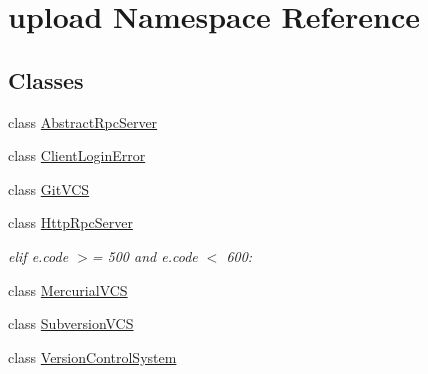 \hypertarget{namespaceupload}{}\section{upload Namespace Reference}
\label{namespaceupload}
\subsection*{Classes}
\begin{DoxyCompactItemize}
\item 
class \mbox{\hyperlink{classupload_1_1_abstract_rpc_server}{Abstract\+Rpc\+Server}}
\item 
class \mbox{\hyperlink{classupload_1_1_client_login_error}{Client\+Login\+Error}}
\item 
class \mbox{\hyperlink{classupload_1_1_git_v_c_s}{Git\+V\+CS}}
\item 
class \mbox{\hyperlink{classupload_1_1_http_rpc_server}{Http\+Rpc\+Server}}
\begin{DoxyCompactList}\small\item\em elif e.\+code $>$= 500 and e.\+code $<$ 600\+: \end{DoxyCompactList}\item 
class \mbox{\hyperlink{classupload_1_1_mercurial_v_c_s}{Mercurial\+V\+CS}}
\item 
class \mbox{\hyperlink{classupload_1_1_subversion_v_c_s}{Subversion\+V\+CS}}
\item 
class \mbox{\hyperlink{classupload_1_1_version_control_system}{Version\+Control\+System}}
\end{DoxyCompactItemize}
